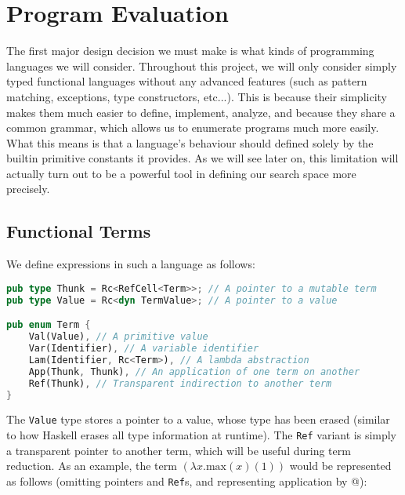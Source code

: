 \section{Program Evaluation}

The first major design decision we must make is what kinds of programming languages we will consider. Throughout this project, we will only consider simply typed functional languages without any advanced features (such as pattern matching, exceptions, type constructors, etc...). This is because their simplicity makes them much easier to define, implement, analyze, and because they share a common grammar, which allows us to enumerate programs much more easily. What this means is that a language's behaviour should defined solely by the builtin primitive constants it provides. As we will see later on, this limitation will actually turn out to be a powerful tool in defining our search space more precisely.

\subsection{Functional Terms}

We define expressions in such a language as follows: 

\begin{lstlisting}[language=rust]
pub type Thunk = Rc<RefCell<Term>>; // A pointer to a mutable term
pub type Value = Rc<dyn TermValue>; // A pointer to a value

pub enum Term {
    Val(Value), // A primitive value
    Var(Identifier), // A variable identifier
    Lam(Identifier, Rc<Term>), // A lambda abstraction 
    App(Thunk, Thunk), // An application of one term on another
    Ref(Thunk), // Transparent indirection to another term 
}
\end{lstlisting}

The \texttt{Value} type stores a pointer to a value, whose type has been erased (similar to how Haskell erases all type information at runtime). The \texttt{Ref} variant is simply a transparent pointer to another term, which will be useful during term reduction. As an example, the term $(\lambda x.\mathrm{max}(x)(1))$ would be represented as follows (omitting pointers and \texttt{Ref}s, and representing application by @):

\begin{center}
\end{center}

